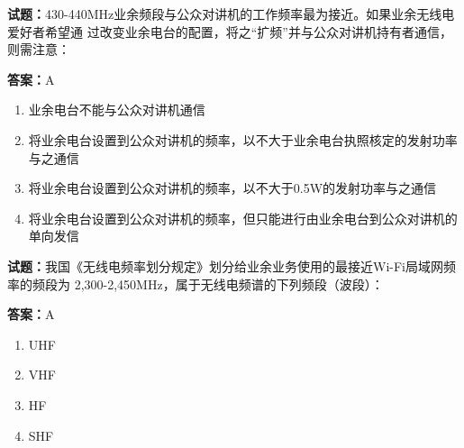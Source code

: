 \documentclass{ctexbook}
\begin{document}




\vspace{1em}

\textbf{试题：}430-440MHz业余频段与公众对讲机的工作频率最为接近。如果业余无线电爱好者希望通
过改变业余电台的配置，将之“扩频”并与公众对讲机持有者通信，则需注意： 

\textbf{答案：}A 

\begin{enumerate}[leftmargin=3em]
  \item 业余电台不能与公众对讲机通信 

  \item 将业余电台设置到公众对讲机的频率，以不大于业余电台执照核定的发射功率与之通信 

  \item 将业余电台设置到公众对讲机的频率，以不大于0.5W的发射功率与之通信 

  \item 将业余电台设置到公众对讲机的频率，但只能进行由业余电台到公众对讲机的单向发信 

\end{enumerate}





\vspace{1em}

\textbf{试题：}我国《无线电频率划分规定》划分给业余业务使用的最接近Wi-Fi局域网频率的频段为
2,300-2,450MHz，属于无线电频谱的下列频段（波段）： 

\textbf{答案：}A 

\begin{enumerate}[leftmargin=3em]
  \item UHF 

  \item VHF 

  \item HF 

  \item SHF 

\end{enumerate}





\vspace{1em}
\end{document}
